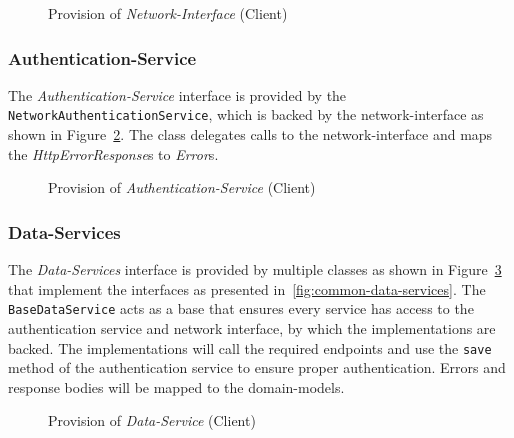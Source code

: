 \begin{figure}
    \centering
    \caption{Provision of \textit{Network-Interface} (Client)}
    \label{fig:common-networkinterface-p}
\end{figure}

\subsubsection{Authentication-Service}
The \textit{Authentication-Service} interface is provided by the \texttt{NetworkAuthenticationService}, which is backed by the network-interface as shown in Figure~\ref{fig:common-authentication-service-p}.
The class delegates calls to the network-interface and maps the \textit{HttpErrorResponse}s to \textit{Error}s.

\begin{figure}
    \centering
    \caption{Provision of \textit{Authentication-Service} (Client)}
    \label{fig:common-authentication-service-p}
\end{figure}

\subsubsection{Data-Services}
The \textit{Data-Services} interface is provided by multiple classes as shown in Figure~\ref{fig:common-data-services-p} that implement the interfaces as presented in~\ref{fig:common-data-services}. \newline
The \texttt{BaseDataService} acts as a base that ensures every service has access to the authentication service and network interface, by which the implementations are backed.
The implementations will call the required endpoints and use the \texttt{save} method of the authentication service to ensure proper authentication.
Errors and response bodies will be mapped to the domain-models.

\begin{figure}
    \centering
    \caption{Provision of \textit{Data-Service} (Client)}
    \label{fig:common-data-services-p}
\end{figure}

